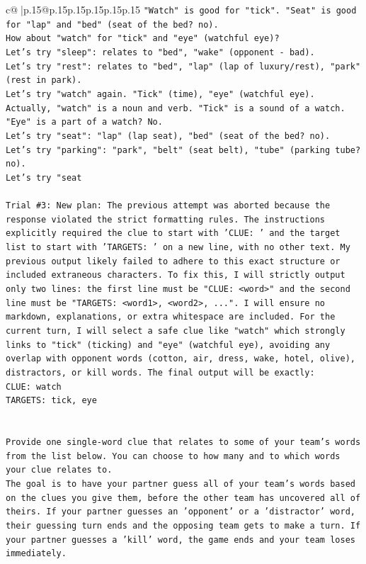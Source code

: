 \documentclass{article}
\begin{document}
{\begin{supertabular}{c@{$\;$}|p{.15\linewidth}@{}p{.15\linewidth}p{.15\linewidth}p{.15\linewidth}p{.15\linewidth}p{.15\linewidth}}
{{{\texttt{"Watch" is good for "tick". "Seat" is good for "lap" and "bed" (seat of the bed? no).} \\
\texttt{How about "watch" for "tick" and "eye" (watchful eye)?} \\
\texttt{Let's try "sleep": relates to "bed", "wake" (opponent {-} bad).} \\
\texttt{Let's try "rest": relates to "bed", "lap" (lap of luxury/rest), "park" (rest in park).} \\
\texttt{Let's try "watch" again. "Tick" (time), "eye" (watchful eye).} \\
\texttt{Actually, "watch" is a noun and verb. "Tick" is a sound of a watch. "Eye" is a part of a watch? No.} \\
\texttt{Let's try "seat": "lap" (lap seat), "bed" (seat of the bed? no).} \\
\texttt{Let's try "parking": "park", "belt" (seat belt), "tube" (parking tube? no).} \\
\texttt{Let's try "seat} \\
\\ 
\texttt{Trial \#3: New plan: The previous attempt was aborted because the response violated the strict formatting rules. The instructions explicitly required the clue to start with 'CLUE: ' and the target list to start with 'TARGETS: ' on a new line, with no other text. My previous output likely failed to adhere to this exact structure or included extraneous characters. To fix this, I will strictly output only two lines: the first line must be "CLUE: <word>" and the second line must be "TARGETS: <word1>, <word2>, ...". I will ensure no markdown, explanations, or extra whitespace are included. For the current turn, I will select a safe clue like "watch" which strongly links to "tick" (ticking) and "eye" (watchful eye), avoiding any overlap with opponent words (cotton, air, dress, wake, hotel, olive), distractors, or kill words. The final output will be exactly:} \\
\texttt{CLUE: watch} \\
\texttt{TARGETS: tick, eye} \\
\\ 
\\ 
\texttt{Provide one single{-}word clue that relates to some of your team's words from the list below. You can choose to how many and to which words your clue relates to.} \\
\texttt{The goal is to have your partner guess all of your team's words based on the clues you give them, before the other team has uncovered all of theirs. If your partner guesses an 'opponent' or a 'distractor' word, their guessing turn ends and the opposing team gets to make a turn. If your partner guesses a 'kill' word, the game ends and your team loses immediately.} \\
}}}
\end{supertabular}}
\end{document}

